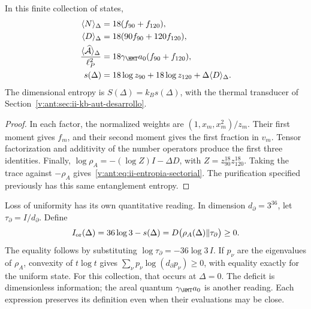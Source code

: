 \begin{proposition}
In this finite collection of states,
\begin{align}
 \langle N\rangle_\Delta&=18(f_{90}+f_{120}),\\
 \langle D\rangle_\Delta&=18(90f_{90}+120f_{120}),\\
 \frac{\langle\widehat{\mathcal A}\rangle_\Delta}{\ell_P^2}
 &=18\gamma_{\HMT}a_0(f_{90}+f_{120}),
 \label{v:ant:eq:ii-area-media}\\
 s(\Delta)&=18\log z_{90}+18\log z_{120}
                  +\Delta\langle D\rangle_\Delta.
 \label{v:ant:eq:ii-entropia-sectorial}
\end{align}
The dimensional entropy is $S(\Delta)=k_Bs(\Delta)$, with the
thermal transducer of Section~\ref{v:ant:sec:ii-kb-aut-desarrollo}.
\end{proposition}
\begin{proof}
In each factor, the normalized weights are
$(1,x_m,x_m^2)/z_m$. Their first moment gives $f_m$, and their second
moment gives the first fraction in $v_m$. Tensor factorization
and additivity of the number operators produce the first three
identities. Finally,
$\log\rho_A=-(\log Z)I-\Delta D$, with
$Z=z_{90}^{18}z_{120}^{18}$. Taking the trace against $-\rho_A$
gives~\eqref{v:ant:eq:ii-entropia-sectorial}. The purification specified
previously has this same entanglement entropy.
\end{proof}

Loss of uniformity has its own quantitative reading.
In dimension \(d_\partial=3^{36}\), let
\(\tau_\partial=I/d_\partial\). Define
\begin{equation}
 I_{\rm or}(\Delta)=36\log3-s(\Delta)
 =D\bigl(\rho_A(\Delta)\Vert\tau_\partial\bigr)\ge0.
 \label{v:ant:eq:ii-area-deficit-informacional}
\end{equation}
The equality follows by substituting
\(\log\tau_\partial=-36\log3\,I\). If \(p_\nu\) are the
eigenvalues of \(\rho_A\), convexity of \(t\log t\) gives
\(\sum_\nu p_\nu\log(d_\partial p_\nu)\ge0\), with equality
exactly for the uniform state. For this collection, that occurs at
\(\Delta=0\). The deficit is dimensionless information; the areal
quantum \(\gamma_{\HMT}a_0\) is another reading. Each expression preserves
its definition even when their evaluations may be close.

